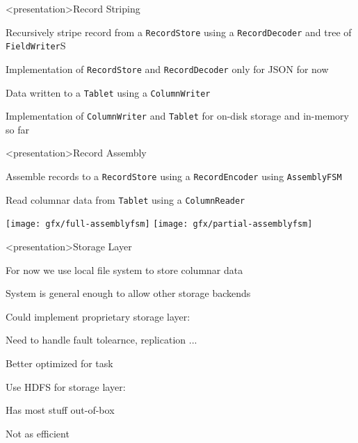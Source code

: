 \begin{frame}<presentation>{Record Striping}
\begin{niitemize}
 \item Recursively stripe record from a \texttt{RecordStore} using a
  \texttt{RecordDecoder} and tree of \texttt{FieldWriter}S
 \item Implementation of \texttt{RecordStore} and \texttt{RecordDecoder} only
  for JSON for now
 \item Data written to a \texttt{Tablet} using a \texttt{ColumnWriter}
 \item Implementation of \texttt{ColumnWriter} and \texttt{Tablet} for on-disk
  storage and in-memory so far
\end{niitemize}
\end{frame}

\begin{frame}<presentation>{Record Assembly}
\begin{niitemize}
 \item Assemble records to a \texttt{RecordStore} using a
  \texttt{RecordEncoder} using \texttt{AssemblyFSM}
 \item Read columnar data from \texttt{Tablet} using a \texttt{ColumnReader}
\end{niitemize}

\texttt{[image: gfx/full-assemblyfsm]}
\hfill
\texttt{[image: gfx/partial-assemblyfsm]}
\end{frame}

\begin{frame}<presentation>{Storage Layer}
\begin{niitemize}
 \item For now we use local file system to store columnar data
 \item System is general enough to allow other storage backends
 \item Could implement proprietary storage layer:
   \begin{niitemize}
     \item Need to handle fault tolearnce, replication ...
     \item Better optimized for task
   \end{niitemize}
 \item Use HDFS for storage layer:
   \begin{niitemize}
     \item Has most stuff out-of-box
     \item Not as efficient
   \end{niitemize}
\end{niitemize}
\end{frame}

